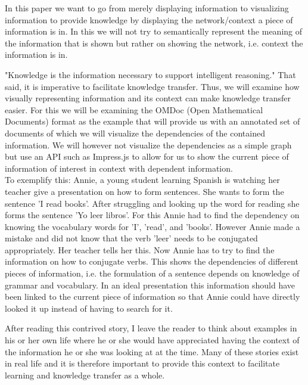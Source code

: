\documentclass[twoside]{article}
\begin{document}
In this paper we want to go from merely displaying information to visualizing information to provide knowledge by displaying the network/context a piece of information is in. In this we will not try to semantically represent the meaning of the information that is shown but rather on showing the network, i.e. context the information is in.


"Knowledge is the information necessary to support intelligent reasoning." \cite{Kohlhase} That said, it is imperative to facilitate knowledge transfer.  Thus, we will examine how visually representing information and its context can make knowledge transfer easier. For this we will be examining the OMDoc (Open Mathematical Documents) format as the example that will provide us with an annotated set of documents of which we will visualize the dependencies of the contained information. We will however not visualize the dependencies as a simple graph but use an API such as Impress.js to allow for us to show the current piece of information of interest in context with dependent information.\\

To exemplify this: Annie, a young student learning Spanish is watching her teacher give a presentation on how to form sentences. She wants to form the sentence 'I read books'. After struggling and looking up the word for reading she forms the sentence 'Yo leer libros'. For this Annie had to find the dependency on knowing the vocabulary words for 'I', 'read', and 'books'. However Annie made a mistake and did not know that the verb 'leer' needs to be conjugated appropriately. Her teacher tells her this. Now Annie has to try to find the information on how to conjugate verbs. This shows the dependencies of different pieces of information, i.e. the formulation of a sentence depends on knowledge of grammar and vocabulary. In an ideal presentation this information should have been linked to the current piece of information so that Annie could have directly looked it up instead of having to search for it.

After reading this contrived story, I leave the reader to think about examples in his or her own life where he or she would have appreciated having the context of the information he or she was looking at at the time. Many of these stories exist in real life and it is therefore important to provide this context to facilitate learning and knowledge transfer as a whole. 
\end{document}
